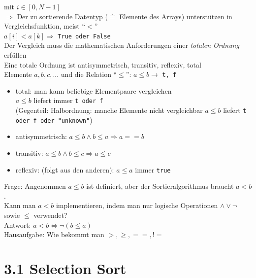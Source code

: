 \documentclass[11pt, fleqn]{scrreprt}
\begin{document}
		mit $i \in [0, N-1]$ \\
		$\Rightarrow$ Der zu sortierende Datentyp ($\widehat{=}$ Elemente des Arrays) unterstützen in Vergleichsfunktion, meist ``$<$'' \\
		$a[i] < a[k] \Rightarrow$ \verb|True oder False| \\
		
		Der Vergleich muss die mathematischen Anforderungen einer \emph{totalen Ordnung} erfüllen \\
			
			
		Eine totale Ordnung ist antisymmetrisch, transitiv, reflexiv, total \\
		Elemente $a,b,c,...$ und die Relation ``$\leq$'': $a \leq b \rightarrow$ \verb|t, f| \\
		\begin{itemize}
				\item total: man kann beliebige Elementpaare vergleichen \\
				$a \leq b$ liefert immer \verb|t oder f| \\
				(Gegenteil: Halbordnung: manche Elemente nicht vergleichbar
				$a\leq b$ liefert \verb|t oder f oder "unknown"|)
				
				\item antisymmetrisch: $a \leq b \land b \leq a \Rightarrow a == b$ 
				\item transitiv: $ a \leq b \land b \leq c \Rightarrow a \leq c$ 
				\item reflexiv: (folgt aus den anderen): $a \leq a$ immer \verb|true| 
		\end{itemize}
			
			Frage: Angenommen $a \leq b$ ist definiert, aber der Sortieralgorithmus braucht $a < b$. \\
			Kann man $a < b$ implementieren, indem man nur logische Operationen $\land \lor \lnot$ sowie $\leq$ verwendet? \\
			
			Antwort: $a < b \Leftrightarrow \lnot(b \leq a)$ \\
			
			Hausaufgabe: Wie bekommt man $>, \geq, ==, !=$ \\
			
			\section*{3.1 Selection Sort}
			
\end{document}
